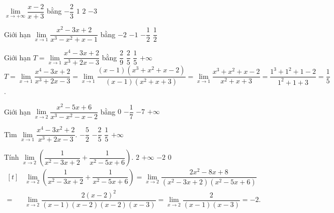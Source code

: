\begin{ex}%
	$\lim\limits_{x\to +\infty } \dfrac {x-2}{x+3}$ bằng
	\choice
	{$-\dfrac {2}{3}$}
	{\True $1$}
	{$2$}
	{$-3$}
\end{ex}
\begin{ex}%
	Giới hạn $\lim\limits_{x\to 1} \dfrac {x^2-3x+2}{x^3-x^2+x-1}$ bằng
	\choice
	{$-2$}
	{$-1$}
	{\True $-\dfrac {1}{2}$}
	{$\dfrac {1}{2}$}
\end{ex}
\begin{ex}%
	Giới hạn $T=\lim\limits_{x\to 1} \dfrac {x^4-3x+2}{x^3+2x-3}$ bằng
	\choice
	{$\dfrac {2}{9}$}
	{$\dfrac {2}{5}$}
	{\True $\dfrac {1}{5}$}
	{$+\infty $}
	\loigiai
	{$T=\lim\limits_{x\to 1} \dfrac {x^4-3x+2}{x^3+2x-3}=\lim\limits_{x\to 1} \dfrac {(x-1)\left(x^3+x^2+x-2\right)}{(x-1)\left(x^2+x+3 \right)}=\lim\limits_{x\to 1} \dfrac {x^3+x^2+x-2}{x^2+x+3}=\dfrac {1^3+1^2+1-2}{1^2+1+3}=\dfrac {1}{5}$.
	}
\end{ex}
\begin{ex}%
	Giới hạn $\lim\limits_{x\to 2} \dfrac {x^2-5x+6}{x^3-x^2-x-2}$ bằng
	\choice
	{$0$}
	{\True $-\dfrac {1}{7}$}
	{$-7$}
	{$+\infty $}
\end{ex}
\begin{ex}%
	Tìm $\lim\limits_{x\to 1} \dfrac {x^4-3x^2+2}{x^3+2x-3}$.
	\choice
	{$-\dfrac {5}{2}$}
	{\True $-\dfrac {2}{5}$}
	{$\dfrac {1}{5}$}
	{$+\infty $}
\end{ex}
\begin{ex}%
	Tính $\lim\limits_{x\to 2} \left( \dfrac {1}{x^2-3x+2}+\dfrac {1}{x^2-5x+6} \right)$.
	\choice
	{$2 $}
	{$+\infty$}
	{\True $-2$}
	{$0$}
	\loigiai
	{\allowdisplaybreaks
		$\begin{aligned}[t]
			&\lim\limits_{x\to 2} \left( \dfrac {1}{x^2-3x+2}+\dfrac {1}{x^2-5x+6} \right)=\lim\limits_{x\to 2} \dfrac {2x^2-8x+8}{\left(x^2-3x+2 \right) \left(x^2-5x+6\right)}\\
			=&\lim\limits_{x\to 2} \dfrac {2(x-2)^2}{(x-1)(x-2)(x-2)(x-3)}=\lim\limits_{x\to 2} \dfrac {2}{(x-1)(x-3)}=-2.
		\end{aligned}$
	}
\end{ex}
